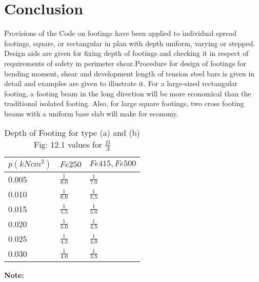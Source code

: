 \documentclass{book}
\begin{document}
\begin{enumerate}
\begin{sagesilent}
\end{sagesilent}                                                        
                                                                        
\begin{figure}                                                          
\begin{center}                                                          
\end{center}                                                            
\end{figure}    

\end{enumerate}
\section{Conclusion}
Provisions of the Code on footings have been applied to individual spread footings, square, or rectangular in plan with depth uniform, varying or stepped. Design aids are given for ﬁxing depth of footings and checking it in respect of requirements of safety in perimeter shear.Procedure for design of footings for bending moment, shear and development length of tension steel bars is given in detail and examples are given to illustrate it. For a large-sized rectangular footing, a footing beam in the long direction will be more economical than the traditional isolated footing. Also, for large square footings, two cross footing beams with a uniform base slab will make for economy.

\begin{table}
\centering
\label{Table 12.1}
\caption{Depth of Footing for type (a) and (b) Fig: 12.1 values for $\frac{D}{A}$}
\begin{tabular}{ |p{3cm}||p{3cm}|p{3cm}|}
 \hline
 $p(kN cm^2)$ & $Fe 250$ & $Fe 415, Fe 500$\\[0.8 ex]
 \hline
 0.005 &$\frac{1}{8.0}$ &$\frac{1}{7.0}$\\[0.5 ex]
 0.010 &$\frac{1}{6.0}$ &$\frac{1}{5.5}$\\[0.5 ex]
 0.015&$\frac{1}{5.5}$ &$\frac{1}{5.0}$\\[0.5 ex]
 0.020 &$\frac{1}{5.0}$ &$\frac{1}{4.5}$\\[0.5 ex]
 0.025 &$\frac{1}{4.5}$ &$\frac{1}{4.0}$\\[0.5 ex]
 0.030 &$\frac{1}{4.0}$ &$\frac{1}{3.5}$\\[2 ex]
 \hline
  \end{tabular}
\end{table}

\textbf{Note:}
\end{document}
